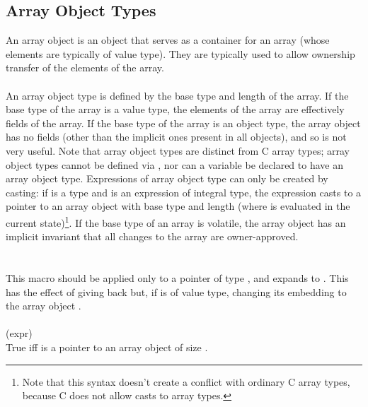 \documentclass[preprint,nocopyrightspace]{sigplanconf}
\begin{document}
{{{\subsection{Array Object Types}
An array object is an object that serves as a container for an array
(whose elements are typically of value type). They are typically used to allow
ownership transfer of the elements of the array.
\\\\
An array object type is defined by the base type and length of the
array. If the base type of the array is a value type, the elements
of the array are effectively fields of the array. If the base type of
the array is an object type, the array object has no fields (other than
the implicit ones
present in all objects), and so is not very useful. Note that
array object types are distinct from C array
types; array object types cannot be defined via , nor can
a variable be declared to have an array object type. Expressions of
array object type can only be created by casting: if  is a type
and  is an expression of integral type, the
expression  casts  to a pointer to an array
object with base type  and length  (where  is
evaluated in the current state)\footnote{Note that this syntax doesn't
create a conflict with ordinary C array types, because C does not
allow casts to array types.}.
If the base type of an array is volatile, the array object has
an implicit invariant that all changes to the array are
owner-approved.
\\\\
\\
This macro should be applied only to a pointer  of type , and
expands to . This has the effect of giving
back  but, if  is of value type, changing its
embedding to the array object . 
\\\\
 (expr)\\
True iff  is a pointer to an array object of size .

}}}
\end{document}
